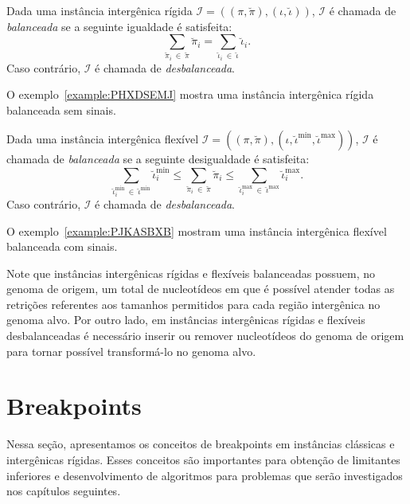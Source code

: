 

\begin{definition}
  Dada uma instância intergênica rígida $\mathcal{I} = ((\pi,\breve\pi),(\iota,\breve\iota))$, $\mathcal{I}$ é chamada de \emph{balanceada} se a seguinte igualdade é satisfeita: 
  $$\sum_{\breve\pi_i~\in~\breve\pi}\breve\pi_i = \sum_{\breve\iota_i~\in~\breve\iota}\breve\iota_i.$$
  Caso contrário, $\mathcal{I}$ é chamada de \emph{desbalanceada}.
\end{definition}

O exemplo~\ref{example:PHXDSEMJ} mostra uma instância intergênica rígida balanceada sem sinais.



\begin{definition}
  Dada uma instância intergênica flexível $\mathcal{I} = ((\pi,\breve\pi),(\iota,\breve\iota^{\min},\breve\iota^{\max}))$, $\mathcal{I}$ é chamada de \emph{balanceada} se a seguinte desigualdade é satisfeita: 
  $$\sum_{\breve\iota^{\min}_i~\in~\breve\iota^{\min}} \breve\iota^{\min}_i \le \sum_{\breve\pi_i~\in~\breve\pi} \breve\pi_i \le \sum_{\breve\iota^{\max}_i~\in~\breve\iota^{\max}}{\breve\iota^{\max}_i}.$$
  Caso contrário, $\mathcal{I}$ é chamada de \emph{desbalanceada}.
\end{definition}

O exemplo~\ref{example:PJKASBXB} mostram uma instância intergênica flexível balanceada com sinais.



Note que instâncias intergênicas rígidas e flexíveis balanceadas possuem, no genoma de origem, um total de nucleotídeos em que é possível atender todas as retrições referentes aos tamanhos permitidos para cada região intergênica no genoma alvo. Por outro lado, em instâncias intergênicas rígidas e flexíveis desbalanceadas é necessário inserir ou remover nucleotídeos do genoma de origem para tornar possível transformá-lo no genoma alvo.

\section{Breakpoints}

Nessa seção, apresentamos os conceitos de breakpoints em instâncias clássicas e intergênicas rígidas. Esses conceitos são importantes para obtenção de limitantes inferiores e desenvolvimento de algoritmos para problemas que serão investigados nos capítulos seguintes.

